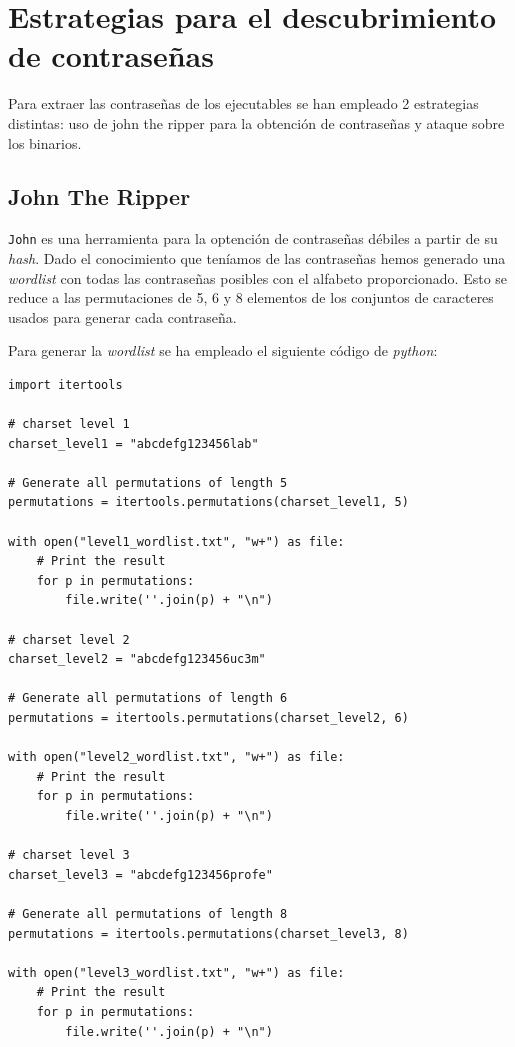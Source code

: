 \documentclass[]{article}
\begin{document}
\section{Estrategias para el descubrimiento de contraseñas}
\label{sec:password}

Para extraer las contraseñas de los ejecutables se han empleado 2 estrategias distintas: uso de john the ripper para la obtención de contraseñas y ataque sobre los binarios.

\subsection{John The Ripper}
\label{sec:john}

\texttt{John} es una herramienta para la optención de contraseñas débiles a partir de su \textit{hash}. Dado el conocimiento que teníamos de las contraseñas hemos generado una \textit{wordlist} con todas las contraseñas posibles con el alfabeto proporcionado. Esto se reduce a las permutaciones de 5, 6 y 8 elementos de los conjuntos de caracteres usados para generar cada contraseña. 

Para generar la \textit{wordlist} se ha empleado el siguiente código de \textit{python}:

\lstset{style=python}
\begin{lstlisting}[caption=Script para la generación de \textit{wordlists}]
import itertools

# charset level 1
charset_level1 = "abcdefg123456lab"

# Generate all permutations of length 5
permutations = itertools.permutations(charset_level1, 5)

with open("level1_wordlist.txt", "w+") as file:
    # Print the result
    for p in permutations:
        file.write(''.join(p) + "\n")
        
# charset level 2
charset_level2 = "abcdefg123456uc3m"

# Generate all permutations of length 6
permutations = itertools.permutations(charset_level2, 6)

with open("level2_wordlist.txt", "w+") as file:
    # Print the result
    for p in permutations:
        file.write(''.join(p) + "\n")

# charset level 3
charset_level3 = "abcdefg123456profe"

# Generate all permutations of length 8
permutations = itertools.permutations(charset_level3, 8)

with open("level3_wordlist.txt", "w+") as file:
    # Print the result
    for p in permutations:
        file.write(''.join(p) + "\n")

\end{lstlisting}
\end{document}
